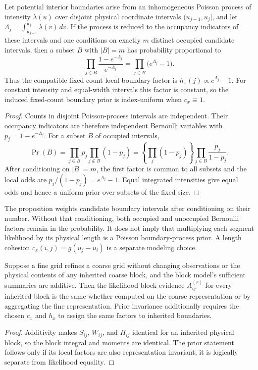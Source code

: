 \begin{proposition}
\label{prop:pp-index-uniform}
Let potential interior boundaries arise from an inhomogeneous Poisson process of intensity
$\lambda(u)$ over disjoint physical coordinate intervals $(u_{j-1},u_j]$, and let
$\Lambda_j=\int_{u_{j-1}}^{u_j}\lambda(v)\,dv$. If the process is reduced to the occupancy
indicators of these intervals and one conditions on exactly $m$ distinct occupied candidate
intervals, then a subset $B$ with $|B|=m$ has probability proportional to
\[
 \prod_{j\in B}\frac{1-e^{-\Lambda_j}}{e^{-\Lambda_j}}
 =\prod_{j\in B}\bigl(e^{\Lambda_j}-1\bigr).
\]
Thus the compatible fixed-count local boundary factor is
$h_x(j)\propto e^{\Lambda_j}-1$. For constant intensity and equal-width intervals this factor is
constant, so the induced fixed-count boundary prior is index-uniform when $c_x\equiv1$.
\end{proposition}
\begin{proof}
Counts in disjoint Poisson-process intervals are independent. Their occupancy indicators are
therefore independent Bernoulli variables with $p_j=1-e^{-\Lambda_j}$. For a subset $B$ of
occupied intervals,
\[
 \Pr(B)=\prod_{j\in B}p_j\prod_{j\notin B}(1-p_j)
 =\left\{\prod_j(1-p_j)\right\}\prod_{j\in B}\frac{p_j}{1-p_j}.
\]
After conditioning on $|B|=m$, the first factor is common to all subsets and the local odds are
$p_j/(1-p_j)=e^{\Lambda_j}-1$. Equal integrated intensities give equal odds and hence a uniform
prior over subsets of the fixed size.
\end{proof}

\begin{remark}
The proposition weights candidate boundary intervals after conditioning on their number. Without that conditioning, both occupied and unoccupied Bernoulli factors remain in the probability. It does not imply that multiplying each
segment likelihood by its physical length is a Poisson boundary-process prior. A length cohesion
$c_x(i,j)=g(u_j-u_i)$ is a separate modeling choice.
\end{remark}

\begin{proposition}
\label{thm:refine}
Suppose a fine grid refines a coarse grid without changing observations or the physical contents of
any inherited coarse block, and the block model's sufficient summaries are additive. Then the
likelihood block evidence $A^{(r)}_{ij}$ for every inherited block is the same whether computed on
the coarse representation or by aggregating the fine representation. Prior invariance additionally
requires the chosen $c_x$ and $h_x$ to assign the same factors to inherited boundaries.
\end{proposition}
\begin{proof}
Additivity makes $S_{ij}$, $W_{ij}$, and $H_{ij}$ identical for an inherited physical block, so the
block integral and moments are identical. The prior statement follows only if its local factors are
also representation invariant; it is logically separate from likelihood equality.
\end{proof}

